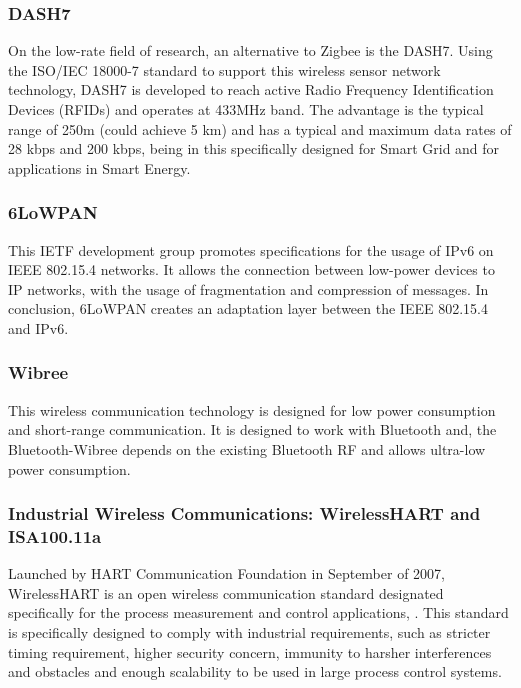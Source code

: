 \subsubsection{DASH7}

On the low-rate field of research, an alternative to Zigbee is the DASH7. Using the ISO/IEC 18000-7 standard to support this wireless sensor network technology, DASH7 is developed to reach active Radio Frequency Identification Devices (RFIDs) and operates at 433MHz band. The advantage is the typical range of 250m (could achieve 5 km) and has a typical and maximum data rates of 28 kbps and 200 kbps, being in this specifically designed for Smart Grid and for applications in Smart Energy.


\subsubsection{6LoWPAN}

This IETF development group promotes specifications for the usage of IPv6 on IEEE 802.15.4 networks. It allows the connection between low-power devices to \ac{IP} networks, with the usage of fragmentation and compression of messages. In conclusion, 6LoWPAN creates an adaptation layer between the IEEE 802.15.4 and IPv6.



\subsubsection{Wibree}

This wireless communication technology is designed for low power consumption and short-range communication. It is designed to work with Bluetooth and, the Bluetooth-Wibree depends on the existing Bluetooth RF and allows ultra-low power consumption.


\subsubsection{Industrial Wireless Communications: WirelessHART and ISA100.11a}

Launched by HART Communication Foundation in September of 2007, WirelessHART is an open wireless communication standard designated specifically for the process measurement and control applications, \cite{Song2008}. This standard is specifically designed to comply with industrial requirements, such as stricter timing requirement, higher security concern, immunity to harsher interferences and obstacles and enough scalability to be used in large process control systems.

